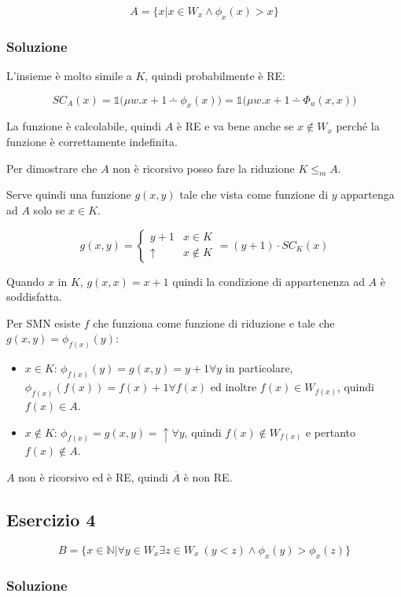 $$
A = \{ x | x \in W_x \wedge \phi_x(x) > x \}
$$

\subsubsection{Soluzione}

L'insieme è molto simile a $K$, quindi probabilmente è RE:

$$
SC_A(x) = \mathbb{1} \bigg(\mu w .  x+1 \dotminus \phi_x(x) \bigg) = \mathbb{1} \bigg(\mu w .  x+1 \dotminus \Phi_u(x,x) \bigg)
$$

La funzione è calcolabile, quindi $A$ è RE e va bene anche se $x \notin W_x$ perché la funzione è correttamente indefinita.

Per dimostrare che $A$ non è ricorsivo posso fare la riduzione $K \leq_m A$.

Serve quindi una funzione $g(x,y)$ tale che vista come funzione di $y$ appartenga ad $A$ solo se $x \in K$.

$$
g(x,y) = \begin{cases}
y+1 &x \in K \\
\uparrow &x \notin K
\end{cases} = (y+1) \cdot SC_K(x)
$$

Quando $x$ in $K$, $g(x,x) = x+1$ quindi la condizione di appartenenza ad $A$ è soddisfatta.

Per SMN esiste $f$ che funziona come funzione di riduzione e tale che $g(x,y) = \phi_{f(x)}(y)$:

\begin{itemize}
	\item $x \in K$: $\phi_{f(x)}(y) = g(x,y) = y+1 \forall y$ in particolare, $\phi_{f(x)}(f(x)) = f(x) +1 \forall f(x)$ ed inoltre $f(x) \in W_{f(x)}$, quindi $f(x) \in A$.
	\item $x \notin K$: $\phi_{f(x)} = g(x,y) = \uparrow \forall y$, quindi $f(x) \notin W_{f(x)}$ e pertanto $f(x) \notin A$.
\end{itemize}

$A$ non è ricorsivo ed è RE, quindi $\overline{A}$ è non RE.

\subsection{Esercizio 4}

$$
B = \{ x \in \mathbb{N} | \forall y \in W_x \exists z \in W_x \: (y < z) \wedge \phi_x(y) > \phi_x(z) \}
$$

\subsubsection{Soluzione}

